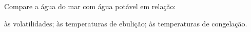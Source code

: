 \documentclass[a4paper,12]{exam}
\begin{document}
\begin{multicols}{2}
\begin{questions}
{
\renewcommand*\thechoice{\alph{choice}}
\renewcommand*\choicelabel{\thechoice)}
%
    Compare a água do mar com água potável em relação:
%    
\begin{choices}
    \choice às volatilidades;
    \choice às temperaturas de ebulição;
    \choice às temperaturas de congelação.
\end{choices}
}
		
		
	\end{questions}	
\end{multicols}
\end{document}
